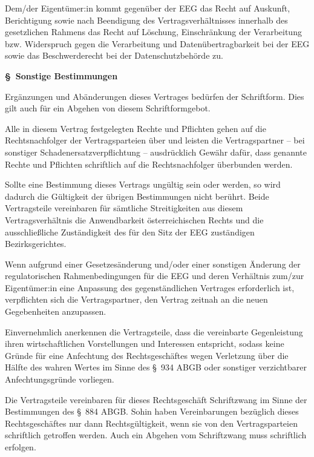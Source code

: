 \documentclass[a4paper,11pt]{article}
\newcounter{parasec}
\newcounter{parasubsec}[parasec]
\newcommand{\parasec}[1]{%
  \stepcounter{parasec}%
  \setcounter{parasubsec}{0}%
  \par\Needspace*{5\baselineskip}%
  \bigskip
  {\large\bfseries\color{tuerkis}\S\ \theparasec\quad #1}\par\nopagebreak
  \smallskip\nopagebreak
}
\begin{document}
Dem/der Eigentümer:in kommt gegenüber der EEG das Recht auf Auskunft, Berichtigung sowie nach Beendigung des Vertragsverhältnisses innerhalb des gesetzlichen Rahmens das Recht auf Löschung, Einschränkung der Verarbeitung bzw. Widerspruch gegen die Verarbeitung und Datenübertragbarkeit bei der EEG sowie das Beschwerderecht bei der Datenschutzbehörde zu.

\parasec{Sonstige Bestimmungen}

Ergänzungen und Abänderungen dieses Vertrages bedürfen der Schriftform. Dies gilt auch für ein Abgehen von diesem Schriftformgebot.

Alle in diesem Vertrag festgelegten Rechte und Pflichten gehen auf die Rechtsnachfolger der Vertragsparteien über und leisten die Vertragspartner -- bei sonstiger Schadenersatzverpflichtung -- ausdrücklich Gewähr dafür, dass genannte Rechte und Pflichten schriftlich auf die Rechtsnachfolger überbunden werden.

Sollte eine Bestimmung dieses Vertrags ungültig sein oder werden, so wird dadurch die Gültigkeit der übrigen Bestimmungen nicht berührt. Beide Vertragsteile vereinbaren für sämtliche Streitigkeiten aus diesem Vertragsverhältnis die Anwendbarkeit österreichischen Rechts und die ausschließliche Zuständigkeit des für den Sitz der EEG zuständigen Bezirksgerichtes.

Wenn aufgrund einer Gesetzesänderung und/oder einer sonstigen Änderung der regulatorischen Rahmenbedingungen für die EEG und deren Verhältnis zum/zur Eigentümer:in eine Anpassung des gegenständlichen Vertrages erforderlich ist, verpflichten sich die Vertragspartner, den Vertrag zeitnah an die neuen Gegebenheiten anzupassen.

Einvernehmlich anerkennen die Vertragsteile, dass die vereinbarte Gegenleistung ihren wirtschaftlichen Vorstellungen und Interessen entspricht, sodass keine Gründe für eine Anfechtung des Rechtsgeschäftes wegen Verletzung über die Hälfte des wahren Wertes im Sinne des \S\ 934 ABGB oder sonstiger verzichtbarer Anfechtungsgründe vorliegen.

Die Vertragsteile vereinbaren für dieses Rechtsgeschäft Schriftzwang im Sinne der Bestimmungen des \S\ 884 ABGB. Sohin haben Vereinbarungen bezüglich dieses Rechtsgeschäftes nur dann Rechtsgültigkeit, wenn sie von den Vertragsparteien schriftlich getroffen werden. Auch ein Abgehen vom Schriftzwang muss schriftlich erfolgen.
\end{document}
